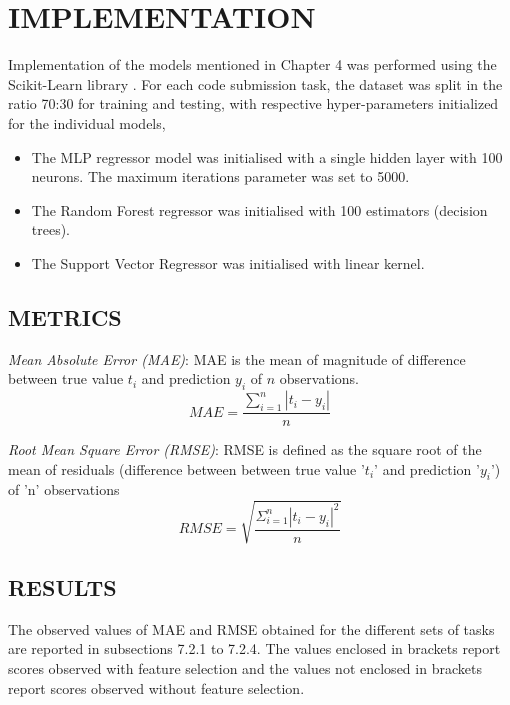\chapter{IMPLEMENTATION}

Implementation of the models mentioned in Chapter 4 was performed
using the Scikit-Learn library \cite{E}. For each code submission
task, the dataset was split in the ratio 70:30 for training and
testing, with respective hyper-parameters initialized for the
individual models,

\begin{itemize}
\item The MLP regressor model was initialised with a single hidden
  layer with 100 neurons. The maximum iterations parameter was set to
  5000.
\item The Random Forest regressor was initialised with 100
  estimators (decision trees).
\item The Support Vector Regressor was initialised with linear kernel.
\end{itemize}


\section{METRICS}
 
\emph{Mean Absolute Error (MAE)}:
MAE is the mean of magnitude of difference between true value
$t_{i}$ and prediction $y_{i}$ of $n$ observations.
\begin{equation}
   MAE = \frac{\sum_{i=1}^{n}|t_i-y_i|}{n} 
\end{equation}


\emph{Root Mean Square Error (RMSE)}: RMSE is defined as the square root of the
mean of residuals (difference between between true value '$t_{i}$' and
prediction '$y_{i}$') of 'n' observations
\begin{equation}
    RMSE = \sqrt{\frac{\Sigma_{i=1}^{n}{|t_i-y_i|}^2}{n}} 
\end{equation}



\section{RESULTS}

The observed values of MAE and RMSE obtained for the different sets of
tasks are reported in subsections 7.2.1 to 7.2.4. The values enclosed
in brackets report scores observed with feature selection and the
values not enclosed in brackets report scores observed without feature
selection.

